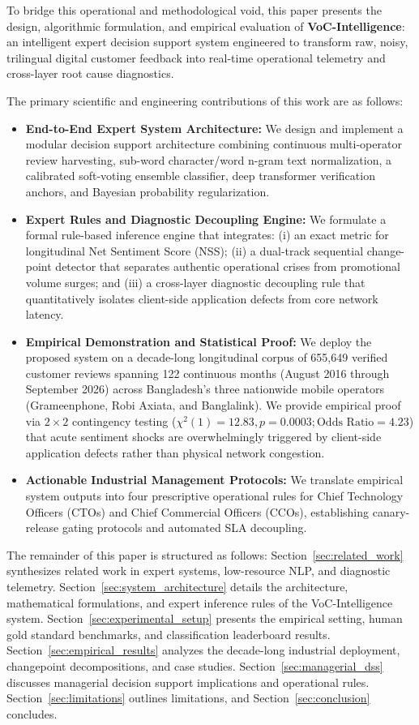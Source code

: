 \documentclass[review,12pt,authoryear]{elsarticle}
\begin{document}
To bridge this operational and methodological void, this paper presents the design, algorithmic formulation, and empirical evaluation of \textbf{VoC-Intelligence}: an intelligent expert decision support system engineered to transform raw, noisy, trilingual digital customer feedback into real-time operational telemetry and cross-layer root cause diagnostics. 

The primary scientific and engineering contributions of this work are as follows:
\begin{itemize}
    \item \textbf{End-to-End Expert System Architecture:} We design and implement a modular decision support architecture combining continuous multi-operator review harvesting, sub-word character/word n-gram text normalization, a calibrated soft-voting ensemble classifier, deep transformer verification anchors, and Bayesian probability regularization.
    \item \textbf{Expert Rules and Diagnostic Decoupling Engine:} We formulate a formal rule-based inference engine that integrates: (i) an exact metric for longitudinal Net Sentiment Score (NSS); (ii) a dual-track sequential change-point detector that separates authentic operational crises from promotional volume surges; and (iii) a cross-layer diagnostic decoupling rule that quantitatively isolates client-side application defects from core network latency.
    \item \textbf{Empirical Demonstration and Statistical Proof:} We deploy the proposed system on a decade-long longitudinal corpus of 655,649 verified customer reviews spanning 122 continuous months (August 2016 through September 2026) across Bangladesh's three nationwide mobile operators (Grameenphone, Robi Axiata, and Banglalink). We provide empirical proof via $2 \times 2$ contingency testing ($\chi^2(1) = 12.83, p = 0.0003; \text{Odds Ratio} = 4.23$) that acute sentiment shocks are overwhelmingly triggered by client-side application defects rather than physical network congestion.
    \item \textbf{Actionable Industrial Management Protocols:} We translate empirical system outputs into four prescriptive operational rules for Chief Technology Officers (CTOs) and Chief Commercial Officers (CCOs), establishing canary-release gating protocols and automated SLA decoupling.
\end{itemize}

The remainder of this paper is structured as follows: Section~\ref{sec:related_work} synthesizes related work in expert systems, low-resource NLP, and diagnostic telemetry. Section~\ref{sec:system_architecture} details the architecture, mathematical formulations, and expert inference rules of the VoC-Intelligence system. Section~\ref{sec:experimental_setup} presents the empirical setting, human gold standard benchmarks, and classification leaderboard results. Section~\ref{sec:empirical_results} analyzes the decade-long industrial deployment, changepoint decompositions, and case studies. Section~\ref{sec:managerial_dss} discusses managerial decision support implications and operational rules. Section~\ref{sec:limitations} outlines limitations, and Section~\ref{sec:conclusion} concludes.
\end{document}
